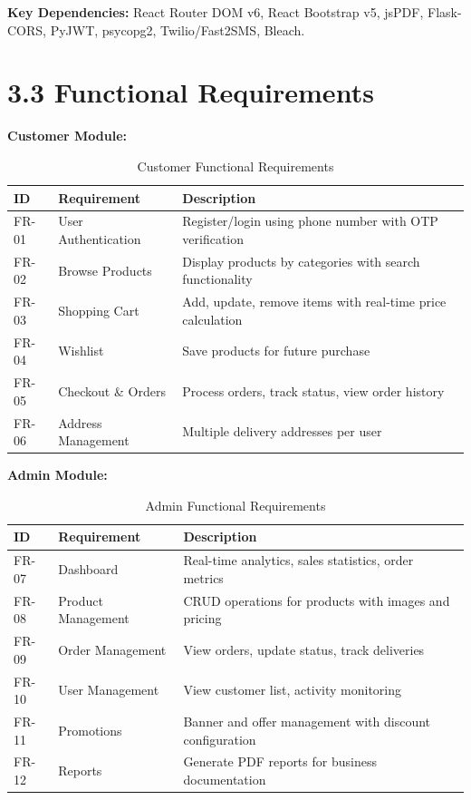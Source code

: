 \documentclass[12pt,a4paper]{report}
\begin{document}
\textbf{Key Dependencies:} React Router DOM v6, React Bootstrap v5, jsPDF, Flask-CORS, PyJWT, psycopg2, Twilio/Fast2SMS, Bleach.

\section*{3.3 Functional Requirements}

\textbf{Customer Module:}
\begin{table}[h]
\centering
\small
\begin{tabular}{|p{1.2cm}|p{3cm}|p{8cm}|}
\hline
\textbf{ID} & \textbf{Requirement} & \textbf{Description} \\
\hline
FR-01 & User Authentication & Register/login using phone number with OTP verification \\
\hline
FR-02 & Browse Products & Display products by categories with search functionality \\
\hline
FR-03 & Shopping Cart & Add, update, remove items with real-time price calculation \\
\hline
FR-04 & Wishlist & Save products for future purchase \\
\hline
FR-05 & Checkout \& Orders & Process orders, track status, view order history \\
\hline
FR-06 & Address Management & Multiple delivery addresses per user \\
\hline
\end{tabular}
\caption{Customer Functional Requirements}
\end{table}

\textbf{Admin Module:}
\begin{table}[h]
\centering
\small
\begin{tabular}{|p{1.2cm}|p{3cm}|p{8cm}|}
\hline
\textbf{ID} & \textbf{Requirement} & \textbf{Description} \\
\hline
FR-07 & Dashboard & Real-time analytics, sales statistics, order metrics \\
\hline
FR-08 & Product Management & CRUD operations for products with images and pricing \\
\hline
FR-09 & Order Management & View orders, update status, track deliveries \\
\hline
FR-10 & User Management & View customer list, activity monitoring \\
\hline
FR-11 & Promotions & Banner and offer management with discount configuration \\
\hline
FR-12 & Reports & Generate PDF reports for business documentation \\
\hline
\end{tabular}
\caption{Admin Functional Requirements}
\end{table}
\end{document}
